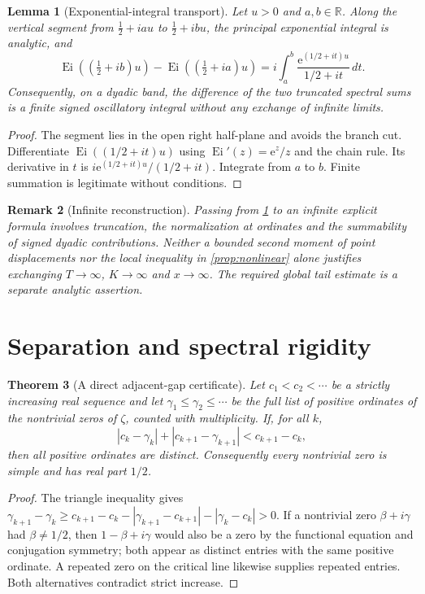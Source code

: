 \documentclass[11pt,reqno]{amsart}
\numberwithin{equation}{section}
\newtheorem{theorem}{Theorem}[section]
\newtheorem{lemma}[theorem]{Lemma}
\newtheorem{remark}[theorem]{Remark}
\newcommand{\R}{\mathbb R}
\newcommand{\e}{\mathrm e}
\begin{document}
\begin{lemma}[Exponential-integral transport]\label{lem:Ei}
Let $u>0$ and $a,b\in\R$. Along the vertical segment from $\frac12+iau$ to $\frac12+ibu$, the principal exponential integral is analytic, and
\begin{equation}\label{eq:Ei}
\operatorname{Ei}((\tfrac12+ib)u)-\operatorname{Ei}((\tfrac12+ia)u)
=i\int_a^b\frac{\e^{(1/2+it)u}}{1/2+it}\,dt.
\end{equation}
Consequently, on a dyadic band, the difference of the two truncated spectral sums is a finite signed oscillatory integral without any exchange of infinite limits.
\end{lemma}
\begin{proof}
The segment lies in the open right half-plane and avoids the branch cut. Differentiate $\operatorname{Ei}((1/2+it)u)$ using $\operatorname{Ei}'(z)=\e^z/z$ and the chain rule. Its derivative in $t$ is $i\e^{(1/2+it)u}/(1/2+it)$. Integrate from $a$ to $b$. Finite summation is legitimate without conditions.
\end{proof}

\begin{remark}[Infinite reconstruction]
Passing from \cref{lem:Ei} to an infinite explicit formula involves truncation, the normalization at ordinates and the summability of signed dyadic contributions. Neither a bounded second moment of point displacements nor the local inequality in \cref{prop:nonlinear} alone justifies exchanging $T\to\infty$, $K\to\infty$ and $x\to\infty$. The required global tail estimate is a separate analytic assertion.
\end{remark}


\section{Separation and spectral rigidity}\label{sec:separation}
\begin{theorem}[A direct adjacent-gap certificate]\label{thm:gap}
Let $c_1<c_2<\cdots$ be a strictly increasing real sequence and let $\gamma_1\le\gamma_2\le\cdots$ be the full list of positive ordinates of the nontrivial zeros of $\zeta$, counted with multiplicity. If, for all $k$,
\begin{equation}\label{eq:gap}
|c_k-\gamma_k|+|c_{k+1}-\gamma_{k+1}|<c_{k+1}-c_k,
\end{equation}
then all positive ordinates are distinct. Consequently every nontrivial zero is simple and has real part $1/2$.
\end{theorem}
\begin{proof}
The triangle inequality gives
$\gamma_{k+1}-\gamma_k\ge c_{k+1}-c_k-|\gamma_{k+1}-c_{k+1}|-|\gamma_k-c_k|>0$.
If a nontrivial zero $\beta+i\gamma$ had $\beta\ne1/2$, then $1-\beta+i\gamma$ would also be a zero by the functional equation and conjugation symmetry; both appear as distinct entries with the same positive ordinate. A repeated zero on the critical line likewise supplies repeated entries. Both alternatives contradict strict increase.
\end{proof}
\end{document}
